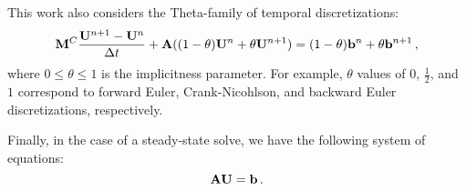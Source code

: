 This work also considers the Theta-family of temporal discretizations:
\begin{equation}
  \mathbf{M}^C\frac{\mathbf{U}^{n+1}-\mathbf{U}^n}{\Delta t} + \mathbf{A}((1-\theta)\mathbf{U}^n + \theta\mathbf{U}^{n+1})
  = (1-\theta)\mathbf{b}^n + \theta\mathbf{b}^{n+1} \,,
\end{equation}
where $0\leq\theta\leq 1$ is the implicitness parameter. For example,
$\theta$ values of $0$, $\frac{1}{2}$, and $1$ correspond to forward Euler,
Crank-Nicohlson, and backward Euler discretizations, respectively.

Finally, in the case of a steady-state solve, we have the following system of equations:
\begin{equation}
  \mathbf{A}\mathbf{U} = \mathbf{b} \,.
\end{equation}
